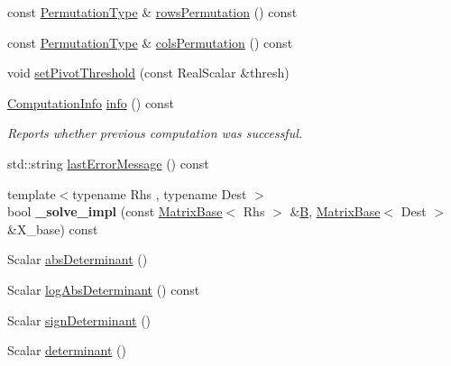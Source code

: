 \begin{DoxyCompactItemize}
\item 
const \hyperlink{group___core___module}{Permutation\+Type} \& \hyperlink{group___sparse_l_u___module_a691295e65c06df599876d78ac2c7fada}{rows\+Permutation} () const
\item 
const \hyperlink{group___core___module}{Permutation\+Type} \& \hyperlink{group___sparse_l_u___module_ab7b0d15d0d9fd1faa164298f92ca59cd}{cols\+Permutation} () const
\item 
void \hyperlink{group___sparse_l_u___module_a94c726c9ebb71a60b529fe47d942ad57}{set\+Pivot\+Threshold} (const Real\+Scalar \&thresh)
\item 
\hyperlink{group__enums_ga85fad7b87587764e5cf6b513a9e0ee5e}{Computation\+Info} \hyperlink{group___sparse_l_u___module_ab0d0c1744ffd5a1dff578a44bcef2a3d}{info} () const
\begin{DoxyCompactList}\small\item\em Reports whether previous computation was successful. \end{DoxyCompactList}\item 
std\+::string \hyperlink{group___sparse_l_u___module_a5458c4e851d7d75c8ca92c4fd02d2adb}{last\+Error\+Message} () const
\item 
\mbox{\label{group___sparse_l_u___module_aca57d33f0acf9d0d4fcf85c715b73cc6}} 
{\footnotesize template$<$typename Rhs , typename Dest $>$ }\\bool {\bfseries \+\_\+solve\+\_\+impl} (const \hyperlink{group___core___module_class_eigen_1_1_matrix_base}{Matrix\+Base}$<$ Rhs $>$ \&\hyperlink{group___core___module_class_eigen_1_1_matrix}{B}, \hyperlink{group___core___module_class_eigen_1_1_matrix_base}{Matrix\+Base}$<$ Dest $>$ \&X\+\_\+base) const
\item 
Scalar \hyperlink{group___sparse_l_u___module_a06fa89424239fb169d408f08252426d0}{abs\+Determinant} ()
\item 
Scalar \hyperlink{group___sparse_l_u___module_a89e30a7df205596784a5a73f4768eaec}{log\+Abs\+Determinant} () const
\item 
Scalar \hyperlink{group___sparse_l_u___module_a6651143e3b18fa90cfb3808b6fd23c4e}{sign\+Determinant} ()
\item 
Scalar \hyperlink{group___sparse_l_u___module_a02d63d242d27211b5c5827f5d4fd99ff}{determinant} ()
\item 
\mbox{\label{group___sparse_l_u___module_ac1678e57af46b42561cea4f149861164}} 

\end{DoxyCompactItemize}
